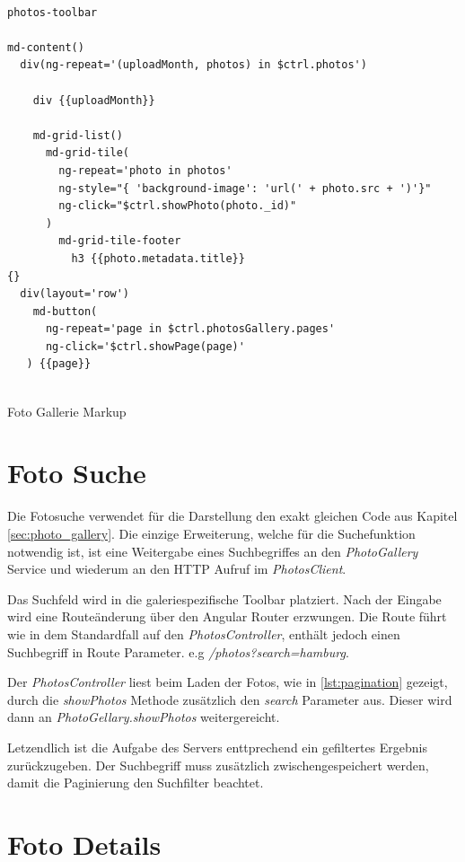 \begin{listing}[H]
\begin{verbatim}

photos-toolbar

md-content()
  div(ng-repeat='(uploadMonth, photos) in $ctrl.photos')

    div {{uploadMonth}}

    md-grid-list()
      md-grid-tile(
        ng-repeat='photo in photos'
        ng-style="{ 'background-image': 'url(' + photo.src + ')'}"
        ng-click="$ctrl.showPhoto(photo._id)"
      )
        md-grid-tile-footer
          h3 {{photo.metadata.title}}
{}
  div(layout='row')
    md-button(
      ng-repeat='page in $ctrl.photosGallery.pages'
      ng-click='$ctrl.showPage(page)'
   ) {{page}}


\end{verbatim}
\caption{Foto Gallerie Markup}
\label{lst:photo_group_jade}
\end{listing}

\section{Foto Suche}

Die Fotosuche verwendet für die Darstellung den exakt gleichen Code aus Kapitel \ref{sec:photo_gallery}. Die einzige Erweiterung, welche für die Suchefunktion notwendig ist, ist eine Weitergabe eines Suchbegriffes an den \textit{PhotoGallery} Service und wiederum an den HTTP Aufruf im \textit{PhotosClient}.

Das Suchfeld wird in die galeriespezifische Toolbar platziert. Nach der Eingabe wird eine Routeänderung über den Angular Router erzwungen. Die Route führt wie in dem Standardfall auf den \textit{PhotosController}, enthält jedoch einen Suchbegriff in Route Parameter. e.g \textit{/photos?search=hamburg}.

Der \textit{PhotosController} liest beim Laden der Fotos, wie in \ref{lst:pagination} gezeigt, durch die \textit{showPhotos} Methode zusätzlich den
\textit{search} Parameter aus. Dieser wird dann an \textit{PhotoGellary.showPhotos} weitergereicht.

Letzendlich ist die Aufgabe des Servers enttprechend ein gefiltertes Ergebnis zurückzugeben. Der Suchbegriff muss zusätzlich zwischengespeichert werden, damit die Paginierung den Suchfilter beachtet.

\section{Foto Details}
\label{sec:photo_details}

